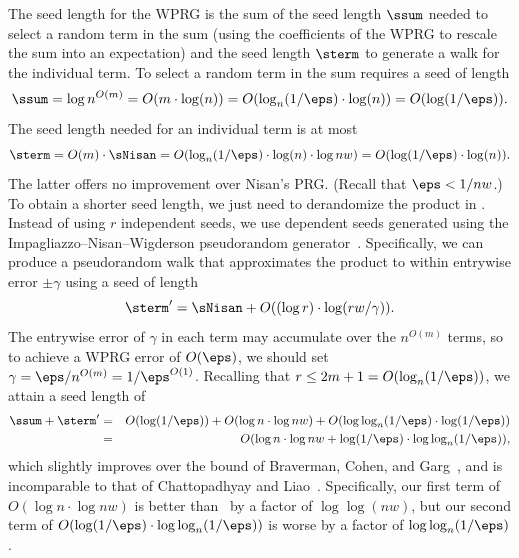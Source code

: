 \documentclass{toc}
\begin{document}
    The seed length
    for the WPRG is the sum of the seed length $\ssum$ needed to select a random term in the sum (using the coefficients of the WPRG to rescale the sum into an expectation) and the seed length $\sterm$ to generate a walk for the individual term.
    To select a random term in the sum requires a seed of length
    $$\ssum = \log n^{O(m)}=O(m\cdot \log(n))=O(\log_{n}(1/\eps)\cdot\log(n))=O(\log(1/\eps)).$$
    The seed length needed for an individual term is at most $$\sterm = O(m)\cdot \sNisan=O(\log_{n}(1/\eps)\cdot \log(n)\cdot\log nw) = O(\log(1/\eps)\cdot \log(n)).$$ 
    The latter offers no improvement over Nisan's PRG. (Recall that $\eps<1/nw$.) To obtain a shorter seed length, we just need to derandomize the product in .  Instead of using $r$ independent seeds, we use dependent seeds generated using the Impagliazzo--Nisan--Wigderson pseudorandom generator~\cite{ImpagliazzoNiWi94}.  Specifically, we can produce a pseudorandom walk that approximates the product to within entrywise error $\pm \gamma$ using a seed of length 
    $$\sterm' = \sNisan+O((\log r)\cdot \log(rw/\gamma)).$$
    The entrywise error of $\gamma$ in each term may accumulate over the $n^{O(m)}$ terms, so to achieve a WPRG error of $O(\eps)$, we should set $\gamma=\eps/n^{O(m)}=1/\eps^{O(1)}$.  Recalling that $r\leq 2m+1 = O(\log_{n}(1/\eps))$, we attain a seed length of
    \begin{eqnarray*}
    \ssum+\sterm' 
    &=& O(\log(1/\eps)) + O(\log n\cdot \log nw) + O(\log\log_{n}(1/\eps)\cdot \log(1/\eps))\\
    &=& O(\log n\cdot \log nw + \log(1/\eps)\cdot \log\log_{n}(1/\eps)),
    \end{eqnarray*}
    which slightly improves over the bound of Braverman, Cohen, and Garg~\cite{BravermanCoGa18}, and is incomparable to that of Chattopadhyay and Liao~\cite{ChattopadhyayLi20}. Specifically, our first term of $O(\log n\cdot \log nw)$ is better than~\cite{ChattopadhyayLi20} by a factor of $\log\log(nw)$, but our second term of $O(\log(1/\eps)\cdot \log\log_{n}(1/\eps))$ is worse by a factor of $\log\log_{n}(1/\eps)$.
    
\end{document}
